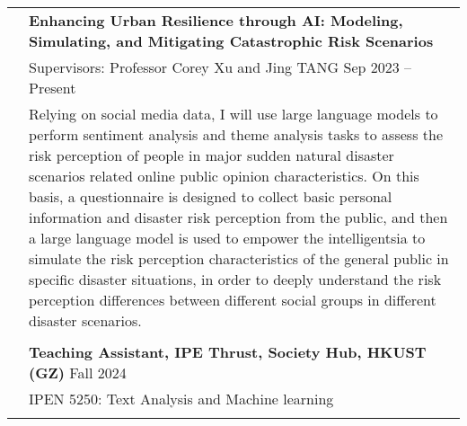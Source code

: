 \documentclass[letterpaper, 11pt]{article}
\begin{document}
\begin{longtable}{p{1.3in}p{4.8in}}
& \textbf{Enhancing Urban Resilience through AI: Modeling, Simulating, and Mitigating Catastrophic Risk Scenarios
} \\
& Supervisors: Professor Corey Xu and Jing TANG \hfill Sep 2023 -- Present \\
& Relying on social media data, I will use large language models to perform sentiment analysis and theme analysis tasks to assess the risk perception of people in major sudden natural disaster scenarios related online public opinion characteristics. On this basis, a questionnaire is designed to collect basic personal information and disaster risk perception from the public, and then a large language model is used to empower the intelligentsia to simulate the risk perception characteristics of the general public in specific disaster situations, in order to deeply understand the risk perception differences between different social groups in different disaster scenarios.\\
& \\


{\color{RoyalBlue}{Teaching Experience}} 
& \textbf{Teaching Assistant, IPE Thrust, Society Hub, HKUST (GZ)} \hfill Fall 2024 \\
& IPEN 5250: Text Analysis and Machine learning \\
& \\




\end{longtable}
\end{document}
